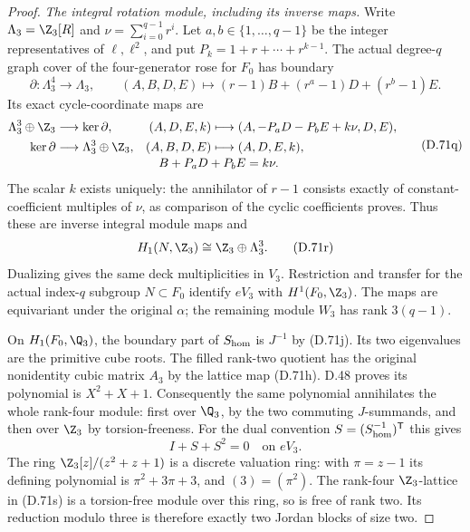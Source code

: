 \begin{proof}
\emph{The integral rotation module, including its inverse maps.}
Write $\Lambda_3=\Z_3[R]$ and
$\nu=\sum_{i=0}^{q-1}r^i$.
Let $a,b\in\{1,\ldots,q-1\}$ be the integer
representatives of $\ell,\ell^2$, and put
$P_k=1+r+\cdots+r^{k-1}$.
The actual degree-$q$ graph cover of the
four-generator rose for $F_0$ has boundary
\[
 \partial:\Lambda_3^4\longrightarrow\Lambda_3,\qquad
 (A,B,D,E)\longmapsto
       (r-1)B+(r^a-1)D+(r^b-1)E .
                                                               \tag{D.71p}
\]
Its exact cycle-coordinate maps are
\[
 \begin{aligned}
 \Lambda_3^3\oplus\Z_3&\longrightarrow\ker\partial,
 &(A,D,E,k)&\longmapsto
          (A,-P_aD-P_bE+k\nu,D,E),\\
 \ker\partial&\longrightarrow\Lambda_3^3\oplus\Z_3,
 &(A,B,D,E)&\longmapsto(A,D,E,k),\\[-2pt]
 &&&\hspace{-15mm}B+P_aD+P_bE=k\nu .
 \end{aligned}                                                \tag{D.71q}
\]
The scalar $k$ exists uniquely: the annihilator
of $r-1$ consists exactly of constant-coefficient
multiples of $\nu$, as comparison of the cyclic
coefficients proves.
Thus these are inverse integral module maps and
\[
                  H_1(N,\Z_3)\cong
                             \Z_3\oplus\Lambda_3^3 .
                                                               \tag{D.71r}
\]
Dualizing gives the same deck multiplicities
in $V_3$.
Restriction and transfer for the actual
index-$q$ subgroup $N\subset F_0$ identify
$eV_3$ with $H^1(F_0,\Z_3)$.
The maps are equivariant under the original
$\alpha$; the remaining module $W_3$
has rank $3(q-1)$.

On $H_1(F_0,\Q_3)$, the boundary part of
$S_{\rm hom}$ is $J^{-1}$ by (D.71j).
Its two eigenvalues are the primitive cube
roots. The filled rank-two quotient has
the original nonidentity cubic matrix
$A_3$ by the lattice map (D.71h).
D.48 proves its polynomial is $X^2+X+1$.
Consequently the same polynomial annihilates
the whole rank-four module:
first over $\Q_3$, by the two commuting
$J$-summands, and then over $\Z_3$ by
torsion-freeness.
For the dual convention
$S=(S_{\rm hom}^{-1})^{\mathsf T}$ this gives
\[
                        I+S+S^2=0\quad\text{on }eV_3.
                                                               \tag{D.71s}
\]
The ring $\Z_3[z]/(z^2+z+1)$ is a discrete
valuation ring: with $\pi=z-1$ its defining
polynomial is $\pi^2+3\pi+3$, and
$(3)=(\pi^2)$.
The rank-four $\Z_3$-lattice in (D.71s)
is a torsion-free module over this ring,
so is free of rank two.
Its reduction modulo three is therefore
exactly two Jordan blocks of size two.


\end{proof}

